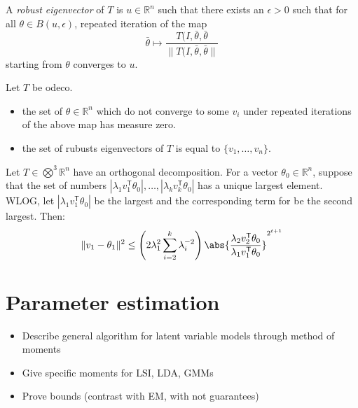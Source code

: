\begin{definition}
A \emph{robust eigenvector} of $T$ is $u \in \mathbb{R}^n$ such that there exists an $\epsilon > 0$ such that for all $\theta \in B(u,\epsilon)$, repeated iteration of the map
\[\bar{\theta} \mapsto \frac{T(I,\bar{\theta},\bar{\theta}}{\|T(I,\bar{\theta},\bar{\theta}\|}\]
starting from $\theta$ converges to $u$.
\end{definition}

\begin{theorem}
Let $T$ be odeco.
\begin{itemize}
    \item the set of $\theta \in \mathbb{R}^n$ which do not converge to some $v_i$ under repeated iterations of the above map has measure zero.
    \item the set of rubusts eigenvectors of $T$ is equal to $\{v_1,\dotsc, v_n\}$.
\end{itemize}
\end{theorem}

\begin{lemma}
Let $T \in \bigotimes^3 \mathbb{R}^n$ have an orthogonal decomposition. For a vector $\theta_0 \in \mathbb{R}^n$, suppose that the set of numbers $|\lambda_1 v_1^\mathsf{T}\theta_0|,\dotsc, |\lambda_k v_k ^\mathsf{T} \theta_0|$ has a unique largest element. WLOG, let $|\lambda_1 v_1^\mathsf{T}\theta_0|$ be the largest and the corresponding term for be the second largest. Then:
\[\|v_1 - \theta_1 \|^2 \leq \left(2\lambda_1^{2} \sum_{i=2}^k \lambda_i^{-2}\right)\abs{\frac{\lambda_2v_2^\mathsf{T} \theta_0}{\lambda_1v_1^\mathsf{T}\theta_0}}^{2^{t+1}}\]
\end{lemma}

\section{Parameter estimation}

\begin{itemize}
    \item Describe general algorithm for latent variable models through method of moments
    \item Give specific moments for LSI, LDA, GMMs
    \item Prove bounds (contrast with EM, with not guarantees)
\end{itemize}

